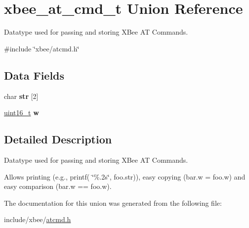 \hypertarget{unionxbee__at__cmd__t}{\section{xbee\-\_\-at\-\_\-cmd\-\_\-t Union Reference}
\label{unionxbee__at__cmd__t}
}


Datatype used for passing and storing X\-Bee A\-T Commands.  




{\ttfamily \#include \char`\"{}xbee/atcmd.\-h\char`\"{}}

\subsection*{Data Fields}
\begin{DoxyCompactItemize}
\item 
\hypertarget{unionxbee__at__cmd__t_a02b28928bd3f0a14b247f8a1949bfbbf}{char {\bfseries str} \mbox{[}2\mbox{]}}\label{unionxbee__at__cmd__t_a02b28928bd3f0a14b247f8a1949bfbbf}

\item 
\hypertarget{unionxbee__at__cmd__t_a69e28057d97f59f81862a467cc6299fc}{\hyperlink{group__hal_ga5a8b2dc9e45a9ee81a94ef304fb62505}{uint16\-\_\-t} {\bfseries w}}\label{unionxbee__at__cmd__t_a69e28057d97f59f81862a467cc6299fc}

\end{DoxyCompactItemize}


\subsection{Detailed Description}
Datatype used for passing and storing X\-Bee A\-T Commands. 

Allows printing (e.\-g., printf( \char`\"{}\%.\-2s\char`\"{}, foo.\-str)), easy copying (bar.\-w = foo.\-w) and easy comparison (bar.\-w == foo.\-w). 

The documentation for this union was generated from the following file\-:\begin{DoxyCompactItemize}
\item 
include/xbee/\hyperlink{atcmd_8h}{atcmd.\-h}\end{DoxyCompactItemize}
